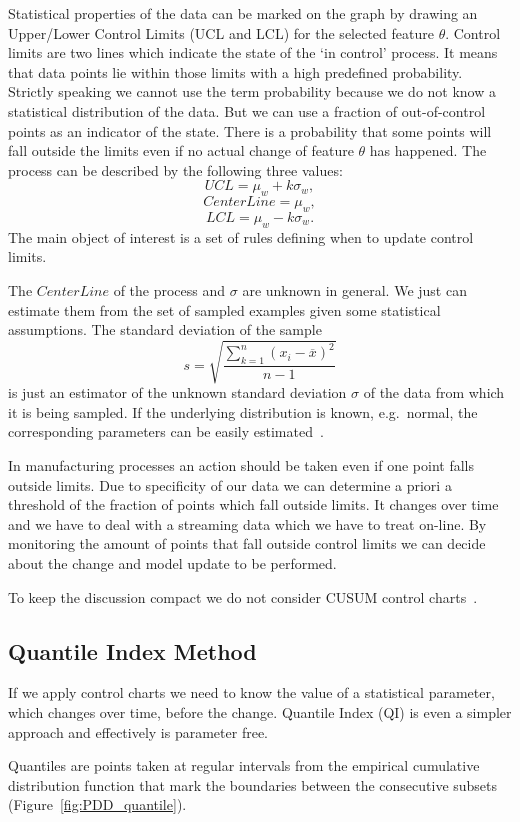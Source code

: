 Statistical properties of the data can be marked on the graph by drawing an Upper/Lower Control Limits (UCL and LCL) for the selected feature $\theta$.
Control limits are two lines which indicate the state of the `in control' process.
It means that data points lie within those limits with a high predefined probability.
Strictly speaking we cannot use the term probability because we do not know a statistical distribution of the data.
But we can use a fraction of out-of-control points as an indicator of the state.
There is a probability that some points will fall outside the limits even if no actual change of feature $\theta$ has happened. 
The process can be described by the following three values:
\[ UCL = \mu_{w} + k\sigma_{w},\] \[Center Line = \mu_{w},\] \[  LCL = \mu_{w} - k\sigma_{w}. \]
The main object of interest is a set of rules defining when to update control limits.

The $CenterLine$ of the process and \textbf{$\sigma$} are unknown in general.
We just can estimate them from the set of sampled examples given some statistical assumptions. 
The standard deviation of the sample 
\[s = \sqrt{\frac{\sum_{k=1}^n (x_{i} - \overline{x})^2}{n-1}} \]
is just an estimator of the unknown standard deviation $\sigma$ of the data from which it is being sampled.
If the underlying distribution is known, e.g.\ normal, the corresponding parameters can be easily estimated~\cite{Nist}.

In manufacturing processes an action should be taken even if one point falls outside limits.
Due to specificity of our data we can determine a priori a threshold of the fraction of points which fall outside limits.
It changes over time and we have to deal with a streaming data which we have to treat on-line.
By monitoring the amount of points that fall outside control limits we can decide about the change and model update to be performed.

To keep the discussion compact we do not consider CUSUM control charts~\cite{cusum}.

\subsection{Quantile Index Method}
If we apply control charts we need to know the value of a statistical parameter, which changes over time, before the change.
Quantile Index (QI) is even a simpler approach and effectively is parameter free. 

Quantiles are points taken at regular intervals from the empirical cumulative distribution function that mark the boundaries between the consecutive subsets
(Figure~\ref{fig:PDD_quantile}).

